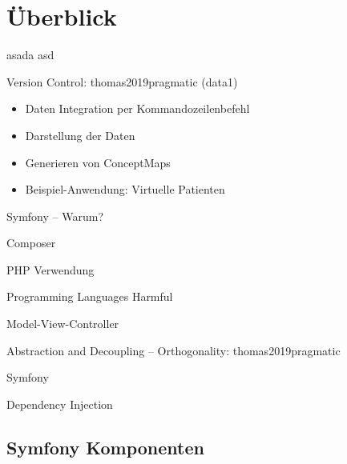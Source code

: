 \section{Überblick}

asada \bfarmer asd

Version Control: thomas2019pragmatic (data1)

\begin{itemize}
\item Daten Integration per Kommandozeilenbefehl
\item Darstellung der Daten
\item Generieren von ConceptMaps
\item Beispiel-Anwendung: Virtuelle Patienten 
\end{itemize}

Symfony -- Warum?  \cite{potencier2022symfony}

Composer \cite{composer}

PHP Verwendung \cite{w3techs}

Programming Languages Harmful \cite{janssenscan}

Model-View-Controller \cite[Seite 176f]{voorhees2020guide}

\begin{figure}[H]
    \centering
    \setlength{\fboxsep}{10pt}\color{black!20}
    \normalcolor\caption{\cite[Seite 177]{voorhees2020guide}}
\end{figure}

Abstraction and Decoupling -- Orthogonality: thomas2019pragmatic

Symfony \cite{potencier2022symfony}

Dependency Injection \cite{seemann2019dependency}

\subsection{Symfony Komponenten}

